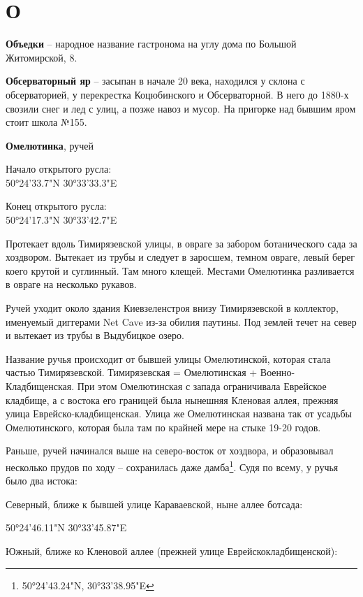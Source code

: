 \chapter*{О}

\textbf{Объедки} – народное название гастронома на углу дома по Большой Житомирской, 8.\\

\medskip

\textbf{Обсерваторный яр} – засыпан в начале 20 века, находился у склона с обсерваторией, у перекрестка Коцюбинского и Обсерваторной. В него до 1880-х свозили снег и лед с улиц, а позже навоз и мусор. На пригорке над бывшим яром стоит школа №155.\\

\medskip

\textbf{Омелютинка}, ручей

Начало открытого русла:\\ 50°24'33.7"N 30°33'33.3"E

Конец открытого русла:\\ 50°24'17.3"N 30°33'42.7"E

Протекает вдоль Тимирязевской улицы, в овраге за забором ботанического сада за хоздвором. Вытекает из трубы и следует в заросшем, темном овраге, левый берег коего крутой и суглинный. Там много клещей. Местами Омелютинка разливается в овраге на несколько рукавов.

Ручей уходит около здания Киевзеленстроя внизу Тимирязевской в коллектор, именуемый диггерами Net Cave из-за обилия паутины. Под землей течет на север и вытекает из трубы в Выдубицкое озеро.

Название ручья происходит от бывшей улицы Омелютинской, которая стала частью Тимирязевской. Тимирязевская = Омелютинская + Военно-Кладбищенская. При этом Омелютинская с запада ограничивала Еврейское кладбище, а с востока его границей была нынешняя Кленовая аллея, прежняя улица Еврейско-кладбищенская. Улица же Омелютинская названа так от усадьбы Омелютинского, которая была там по крайней мере на стыке 19-20 годов.

Раньше, ручей начинался выше на северо-восток от хоздвора, и образовывал несколько прудов по ходу – сохранилась даже дамба\footnote{50°24'43.24"N,  30°33'38.95"E}. Судя по всему, у ручья было два истока:

Северный, ближе к бывшей улице Караваевской, ныне аллее ботсада: 

50°24'46.11"N 30°33'45.87"E

Южный, ближе ко Кленовой аллее (прежней улице Еврейскокладбищенской):

